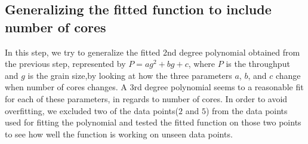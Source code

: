 \vspace{\baselineskip}	
\subsection{Generalizing the fitted function to include number of cores}
In this step, we try to generalize the fitted 2nd degree polynomial obtained from the previous step, represented by $P=ag^2+bg+c$, where $P$ is the throughput and $g$ is the grain size,by looking at how the three parameters $a$, $b$, and $c$ change when number of cores changes. 
A $3$rd degree polynomial seems to a reasonable fit for each of these parameters, in regards to number of cores. In order to avoid overfitting, we excluded two of the data points($2$ and $5$) from the data points used for fitting the polynomial and tested the fitted function on those two points to see how well the function is working on unseen data points. 


